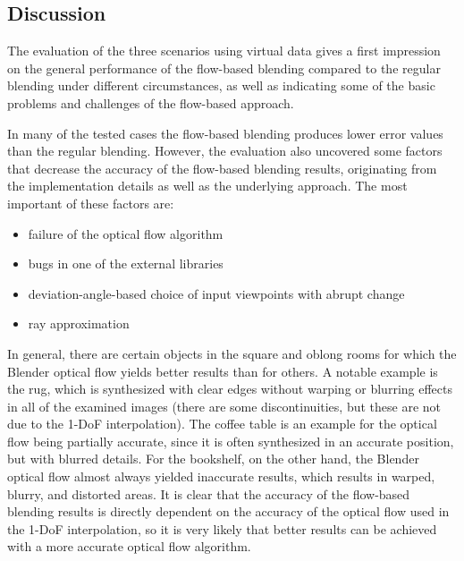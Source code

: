 \subsection{Discussion} \label{subsec:discussion_virtual}
The evaluation of the three scenarios using virtual data gives a first impression on the general performance of the flow-based blending compared to the regular blending under different circumstances, as well as indicating some of the basic problems and challenges of the flow-based approach.


In many of the tested cases the flow-based blending produces lower error values than the regular blending. However, the evaluation also uncovered some factors that decrease the accuracy of the flow-based blending results, originating from the implementation details as well as the underlying approach. The most important of these factors are:

\begin{itemize}
  \item failure of the optical flow algorithm
  \item bugs in one of the external libraries
  \item deviation-angle-based choice of input viewpoints with abrupt change
  \item ray approximation
\end{itemize}

In general, there are certain objects in the square and oblong rooms for which the Blender optical flow yields better results than for others. A notable example is the rug, which is synthesized with clear edges without warping or blurring effects in all of the examined images (there are some discontinuities, but these are not due to the 1-DoF interpolation). The coffee table is an example for the optical flow being partially accurate, since it is often synthesized in an accurate position, but with blurred details. For the bookshelf, on the other hand, the Blender optical flow almost always yielded inaccurate results, which results in warped, blurry, and distorted areas. It is clear that the accuracy of the flow-based blending results is directly dependent on the accuracy of the optical flow used in the 1-DoF interpolation, so it is very likely that better results can be achieved with a more accurate optical flow algorithm.

